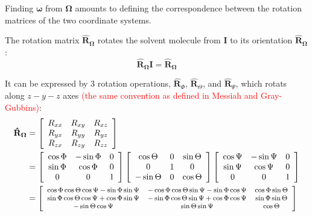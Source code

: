 %
Finding $\boldsymbol{\omega}$ from $\mathbf{\Omega}$ amounts to
defining the correspondence between the rotation matrices of the two
coordinate systems. 

The rotation matrix $\mathbf{\hat{R}}_{\mathbf{\Omega}}$ rotates
the solvent molecule from $\mathbf{I}$ to its orientation $\mathbf{\hat{R}}_{\mathbf{\Omega}}$:
\begin{equation}
\mathbf{\hat{R}}_{\mathbf{\Omega}}\mathbf{I}=\mathbf{\hat{R}}_{\mathbf{\Omega}}
\end{equation}


It can be expressed by 3 rotation operations, $\mathbf{\hat{R}}_{\Phi}$,
$\mathbf{\hat{R}}_{\Theta}$, and $\mathbf{\hat{R}}_{\Psi}$, which
rotats along $z-y-z$ axes \textcolor{red}{(the same convention as
defined in Messiah and Gray-Gubbins)}:
\begin{align}
\mathbf{\hat{R}}_{\mathbf{\Omega}} & =\left[\begin{array}{ccc}
R_{xx} & R_{xy} & R_{xz}\\
R_{yx} & R_{yy} & R_{yz}\\
R_{zx} & R_{zy} & R_{zz}
\end{array}\right]\\
 & =\left[\begin{array}{ccc}
\cos\Phi & -\sin\Phi & 0\\
\sin\Phi & \cos\Phi & 0\\
0 & 0 & 1
\end{array}\right]\left[\begin{array}{ccc}
\cos\Theta & 0 & \sin\Theta\\
0 & 1 & 0\\
-\sin\Theta & 0 & \cos\Theta
\end{array}\right]\left[\begin{array}{ccc}
\cos\Psi & -\sin\Psi & 0\\
\sin\Psi & \cos\Psi & 0\\
0 & 0 & 1
\end{array}\right]\nonumber \\
 & =\footnotesize\left[\begin{array}{ccc}
\cos\Phi\cos\Theta\cos\Psi-\sin\Phi\sin\Psi & -\cos\Phi\cos\Theta\sin\Psi-\sin\Phi\cos\Psi & \cos\Phi\sin\Theta\\
\sin\Phi\cos\Theta\cos\Psi+\cos\Phi\sin\Psi & -\sin\Phi\cos\Theta\sin\Psi+\cos\Phi\cos\Psi & \sin\Phi\sin\Theta\\
-\sin\Theta\cos\Psi & \sin\Theta\sin\Psi & \cos\Theta
\end{array}\right]\nonumber 
\end{align}
